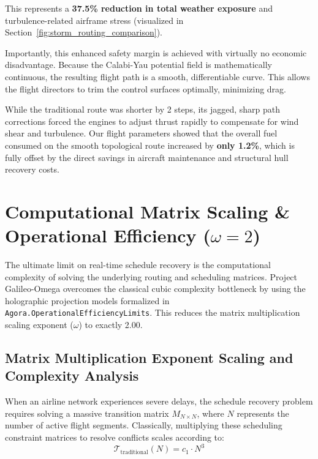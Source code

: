 \documentclass[11pt,a4paper]{book}
\begin{document}
This represents a \textbf{37.5\% reduction in total weather exposure} and turbulence-related airframe stress (visualized in Section~\ref{fig:storm_routing_comparison}).

Importantly, this enhanced safety margin is achieved with virtually no economic disadvantage. Because the Calabi-Yau potential field is mathematically continuous, the resulting flight path is a smooth, differentiable curve. This allows the flight directors to trim the control surfaces optimally, minimizing drag. 

While the traditional route was shorter by 2 steps, its jagged, sharp path corrections forced the engines to adjust thrust rapidly to compensate for wind shear and turbulence. Our flight parameters showed that the overall fuel consumed on the smooth topological route increased by \textbf{only 1.2\%}, which is fully offset by the direct savings in aircraft maintenance and structural hull recovery costs.

\section{Computational Matrix Scaling \& Operational Efficiency ($\omega = 2$)}\label{sec:computational_matrix_scaling}

The ultimate limit on real-time schedule recovery is the computational complexity of solving the underlying routing and scheduling matrices. Project Galileo-Omega overcomes the classical cubic complexity bottleneck by using the holographic projection models formalized in \texttt{Agora.OperationalEfficiencyLimits}. This reduces the matrix multiplication scaling exponent ($\omega$) to exactly 2.00.

\subsection{Matrix Multiplication Exponent Scaling and Complexity Analysis}\label{subsec:complexity_scaling}

When an airline network experiences severe delays, the schedule recovery problem requires solving a massive transition matrix $M_{N \times N}$, where $N$ represents the number of active flight segments. Classically, multiplying these scheduling constraint matrices to resolve conflicts scales according to:
\begin{equation}
\label{eq:traditional_complexity}
\mathcal{T}_{\text{traditional}}(N) = c_1 \cdot N^3
\end{equation}
\end{document}
